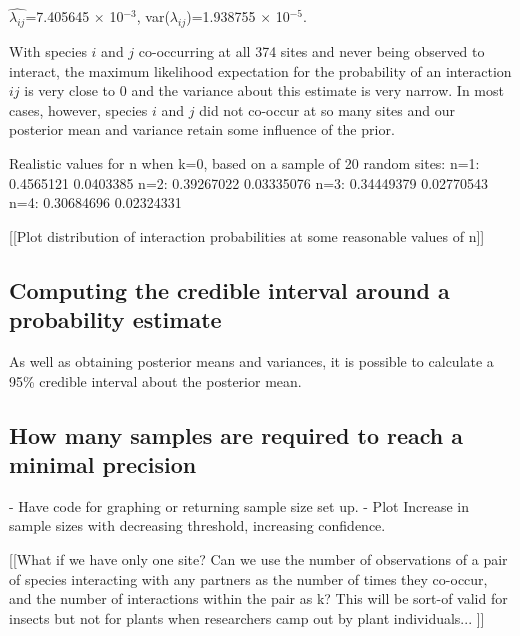 \documentclass[12pt]{article}
\begin{document}
      $\hat{\lambda_{ij}}$=7.405645 $\times$ 10$^{-3}$, var($\lambda_{ij}$)=1.938755 $\times$ 10$^{-5}$.
      
      With species $i$ and $j$ co-occurring at all 374 sites and never being observed to interact, the maximum likelihood expectation for the probability of an interaction $ij$ is very close to 0 and the variance about this estimate is very narrow. In most cases, however, species $i$ and $j$ did not co-occur at so many sites and our posterior mean and variance retain some influence of the prior.


      Realistic values for n when k=0, based on a sample of 20 random sites:
      n=1: 0.4565121 0.0403385
      n=2: 0.39267022 0.03335076
      n=3: 0.34449379 0.02770543
      n=4: 0.30684696 0.02324331


      [[Plot distribution of interaction probabilities at some reasonable values of n]]


  \subsection*{Computing the credible interval around a probability estimate}

      As well as obtaining posterior means and variances, it is possible to calculate a 95\% credible interval about the posterior mean. 


  \subsection*{How many samples are required to reach a minimal precision}


    - Have code for graphing or returning sample size set up.
    - Plot Increase in sample sizes with decreasing threshold, increasing confidence.




  [[What if we have only one site? Can we use the number of observations of a pair of species interacting with any partners as the number of times they co-occur, and the number of interactions within the pair as k? This will be sort-of valid for insects but not for plants when researchers camp out by plant individuals... ]]


\clearpage

     
\end{document}
